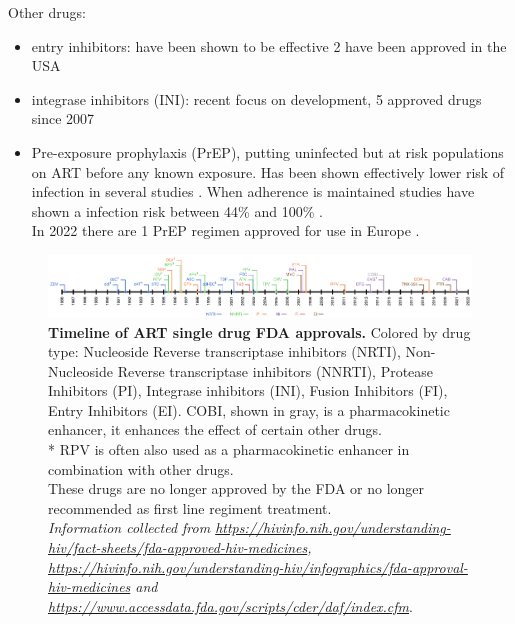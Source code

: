 \documentclass[
  11pt,
  twoside]{scrbook}
\newcommand{\extcaption}[2]{
    \caption[#1]{
        \textbf{#1}\newline
        #2
    }
}
\begin{document}
Other drugs:

\begin{itemize}
\item
  entry inhibitors: have been shown to be effective 2 have been approved in the USA \autocite{tiltonEntryInhibitorsTreatment2010}
\item
  integrase inhibitors (INI): recent focus on development, 5 approved drugs since 2007 \autocite{scarsiHIV1IntegraseInhibitors2020}
\item
  Pre-exposure prophylaxis (PrEP), putting uninfected but at risk populations on ART before any known exposure. Has been shown effectively lower risk of infection in several studies \autocite{grantPreexposureChemoprophylaxisHIV2010,baetenAntiretroviralProphylaxisHIV2012,buchbinderPreexposureProphylaxisPromise2011}. When adherence is maintained studies have shown a infection risk between 44\% and 100\% \autocite{riddellHIVPreexposureProphylaxis2018}.\\
  In 2022 there are 1 PrEP regimen approved for use in Europe \autocite{emaTruvada2018}.
\end{itemize}

\begin{figure}[H]
  \centering
  \includegraphics[width=\textwidth]{./figures/HIV-Intro/timeline.pdf}
  \extcaption{Timeline of ART single drug FDA approvals.}{Colored by drug type: Nucleoside Reverse transcriptase inhibitors (NRTI), Non-Nucleoside Reverse transcriptase inhibitors (NNRTI), Protease Inhibitors (PI), Integrase inhibitors (INI), Fusion Inhibitors (FI), Entry Inhibitors (EI). COBI, shown in gray, is a pharmacokinetic enhancer, it enhances the effect of certain other drugs.\\
* RPV is often also used as a pharmacokinetic enhancer in combination with other drugs.\\
\dag These drugs are no longer approved by the FDA or no longer recommended as first line regiment treatment.\\
\textit{Information collected from \href{https://hivinfo.nih.gov/understanding-hiv/fact-sheets/fda-approved-hiv-medicines}{https://hivinfo.nih.gov/understanding-hiv/fact-sheets/fda-approved-hiv-medicines}, 
\href{https://hivinfo.nih.gov/understanding-hiv/infographics/fda-approval-hiv-medicines}{https://hivinfo.nih.gov/understanding-hiv/infographics/fda-approval-hiv-medicines} and \href{https://www.accessdata.fda.gov/scripts/cder/daf/index.cfm}{https://www.accessdata.fda.gov/scripts/cder/daf/index.cfm}}.}
\label{fig:timeline}
\end{figure}
\end{document}
